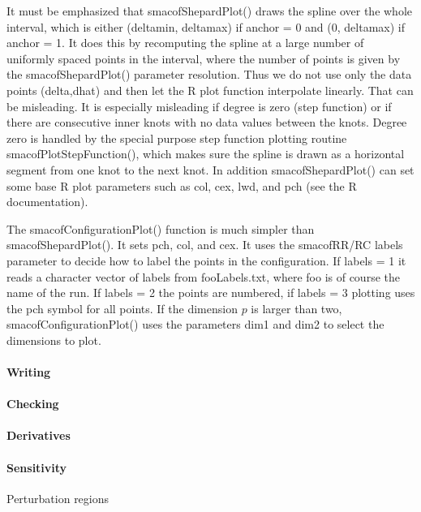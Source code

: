 \documentclass[
  12pt,
]{article}
\begin{document}
It must be emphasized that smacofShepardPlot() draws the spline
over the whole interval, which is either (deltamin, deltamax)
if anchor = 0 and (0, deltamax) if anchor = 1. It does
this by recomputing the spline at a large number of
uniformly spaced points in the interval, where the
number of points is given by the smacofShepardPlot()
parameter resolution. Thus we do not use only the
data points (delta,dhat) and then let the R plot function
interpolate linearly. That can be misleading. It is
especially misleading if degree is zero (step function)
or if there are consecutive inner knots with no data values
between the knots. Degree zero is handled by the special
purpose step function plotting routine smacofPlotStepFunction(),
which makes sure the spline is drawn as a horizontal segment
from one knot to the next knot. In addition smacofShepardPlot()
can set some base R plot parameters such as col, cex, lwd, and pch
(see the R documentation).

The smacofConfigurationPlot() function is much simpler than
smacofShepardPlot(). It sets pch, col, and cex. It uses
the smacofRR/RC labels parameter to decide how to label
the points in the configuration. If labels = 1 it reads
a character vector of labels from fooLabels.txt, where
foo is of course the name of the run. If labels = 2
the points are numbered, if labels = 3 plotting uses
the pch symbol for all points. If the dimension \(p\)
is larger than two, smacofConfigurationPlot() uses
the parameters dim1 and dim2 to select the dimensions
to plot.

\paragraph{Writing}\label{writing}

\paragraph{Checking}\label{checking}

\paragraph{Derivatives}\label{derivatives-1}

\paragraph{Sensitivity}\label{sensitivity}

Perturbation regions
\end{document}

